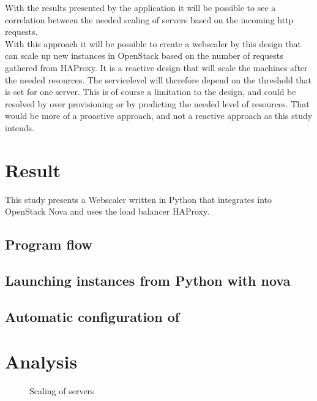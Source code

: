 

With the results presented by the application it will be possible to see a
correlation between the needed scaling of servers based on the incoming http
requests.\\

With this approach it will be possible to create a webscaler by this design
that can scale up new instances in OpenStack based on the number of requests
gathered from HAProxy. It is a reactive design that will scale the machines
after the needed resources. The servicelevel will therefore depend on the
threshold that is set for one server. This is of course a limitation to the
design, and could be resolved by over provisioning or by predicting the needed
level of resources. That would be more of a proactive approach, and not a
reactive approach as this study intends.

\section{Result}
This study presents a Webscaler written in Python that integrates into
OpenStack Nova and uses the load balancer HAProxy.

\subsection{Program flow}

\subsection{Launching instances from Python with nova}

\subsection{Automatic configuration of }
\section{Analysis}
\begin{figure}[htp]
\centering
{}
\caption{\label{fig:server_scaling}Scaling of servers}
\end{figure}

